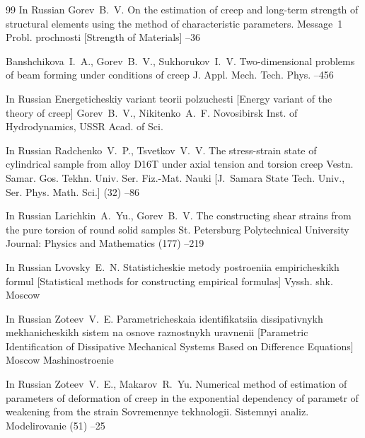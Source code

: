 \begin{thebibliography}{99}
\lang In Russian
\by Gorev~B.~V.
\paper On the estimation of creep and long-term strength of structural elements using the method of characteristic parameters. Message~1
\jour Probl. prochnosti \rm [Strength of Materials]
--36

\by Banshchikova~I.~A., Gorev~B.~V., Sukhorukov~I.~V.
\paper Two-dimensional problems of beam forming under conditions of creep
\jour J. Appl. Mech. Tech. Phys.
--456

\lang In Russian
\book Energeticheskiy variant teorii polzuchesti \rm [Energy variant of the theory of creep]
\by Gorev~B.~V., Nikitenko~A.~F.
\publaddr Novosibirsk
\publ Inst. of Hydrodynamics, USSR Acad. of Sci.

\lang In Russian
\by Radchenko~V.~P., Tsvetkov~V.~V.
\paper The stress-strain state of cylindrical sample from alloy D16T under axial tension and torsion creep
\jour Vestn. Samar. Gos. Tekhn. Univ. Ser. Fiz.-Mat. Nauki \rm [J.~Samara State Tech. Univ., Ser. Phys. Math. Sci.]
(32)
--86

\lang In Russian
\by Larichkin~A.~Yu., Gorev~B.~V.
\paper The constructing shear strains from the pure torsion of round solid samples
\jour St. Petersburg Polytechnical University Journal: Physics and Mathematics
 (177)
--219

\lang In Russian
\by Lvovsky~E.~N.
\book Statisticheskie metody postroeniia empiricheskikh formul 
\rm [Statistical methods for constructing empirical formulas]
\publ Vyssh. shk.
\publaddr Moscow 


\lang In Russian
\by Zoteev~V.~E.
\book Parametricheskaia identifikatsiia dissipativnykh mekhanicheskikh sistem na osnove raznostnykh uravnenii
\rm [Parametric Identification of Dissipative Mechanical Systems Based on Difference Equations]
\publaddr Moscow
\publ Mashinostroenie


\lang In Russian
\by Zoteev~V.~E., Makarov~R.~Yu.
\paper Numerical method of estimation of parameters of deformation of creep in the exponential dependency of parametr of weakening from the strain
\jour Sovremennye tekhnologii. Sistemnyi analiz. Modelirovanie
 (51)
--25


\end{thebibliography}

\renewcommand{\baselinestretch}{0.9}

%
